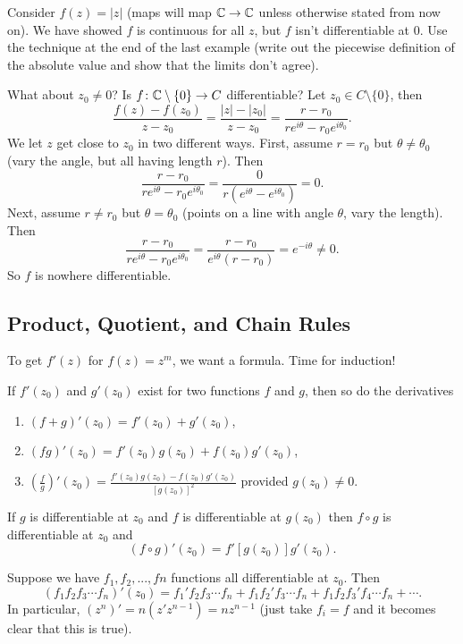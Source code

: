 \begin{example}
    Consider $f(z)=|z|$ (maps will map $\mathbb{C}\to \mathbb{C}$ unless otherwise stated from now on). We have showed $f$ is continuous for all $z$, but $f$ isn't differentiable at $0$. Use the technique at the end of the last example (write out the piecewise definition of the absolute value and show that the limits don't agree). 

    What about $z_0\neq 0$? Is $f \colon \mathbb{C}\setminus \{0\}  \to C$ differentiable? Let $z_0\in C\setminus \{0\} $, then \[
        \frac{f(z)-f(z_0)}{z-z_0}=\frac{|z|-|z_0|}{z-z_0} = \frac{r-r_0}{re^{i\theta}-r_0e^{i\theta_0}}. 
    \] We let $z$ get close to $z_0$ in two different ways. First, assume $r=r_0$ but $\theta\neq\theta_0$ (vary the angle, but all having length $r$). Then \[
    \frac{r-r_0}{re^{i\theta}-r_0e^{i\theta_0}}=\frac{0}{r(e^{i\theta}-e^{i\theta_0})}=0.
\] Next, assume $r\neq r_0$ but $\theta=\theta_0$ (points on a line with angle $\theta$, vary the length). Then \[
\frac{r-r_0}{re^{i\theta}-r_0e^{i\theta_0}}=\frac{r-r_0}{e^{i\theta}(r-r_0)}=e^{-i\theta}\neq 0.
\] So $f$ is nowhere differentiable.
\end{example}

\subsection{Product, Quotient, and Chain Rules}
To get $f'(z)$ for $f(z)=z^{m}$, we want a formula. Time for induction!
\begin{theorem}
    If $f'(z_0)$ and $g'(z_0)$ exist for two functions $f$ and $g$, then so do the derivatives
    \begin{enumerate}
        \item $(f+g)'(z_0)=f'(z_0)+g'(z_0)$,
        \item $(fg)'(z_0)=f'(z_0)g(z_0)+f(z_0)g'(z_0)$,
        \item $(\frac{f}{g})'(z_0)=\frac{f'(z_0)g(z_0)-f(z_0)g'(z_0)}{[g(z_0)]^2}$ provided $g(z_0)\neq 0$.
    \end{enumerate}
\end{theorem}

\begin{theorem}
    If $g$ is differentiable at $z_0$ and $f$ is differentiable at $g(z_0)$ then $f\circ g$ is differentiable at $z_0$ and \[
        (f\circ g)'(z_0)=f'[g(z_0)]g'(z_0).
    \]
\end{theorem}
\begin{note}
   Suppose we have $f_1,f_2,...,fn$ functions all differentiable at $z_0$. Then \[
       (f_1f_2f_3\cdots f_n)'(z_0)=f_1'f_2f_3\cdots f_n + f_1f_2'f_3\cdots f_n + f_1f_2f_3'f_4\cdots f_n+\cdots.
   \]
   In particular, $(z^{n})'=n(z'z^{n-1})=nz^{n-1}$ (just take $f_i=f$ and it becomes clear that this is true). 
\end{note}
